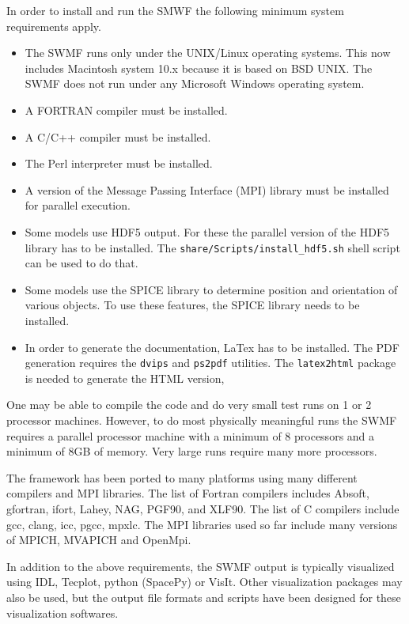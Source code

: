 In order to install and run the SMWF the following minimum system
requirements apply.
\begin{itemize}
\item The SWMF runs only under the UNIX/Linux operating systems.  This now
  includes Macintosh system 10.x because it is based on BSD UNIX.  The
  SWMF does not run under any Microsoft Windows operating system.
\item A FORTRAN compiler must be installed.
\item A C/C++ compiler must be installed.
\item The Perl interpreter must be installed.
\item A version of the Message Passing Interface (MPI) library must be
  installed for parallel execution.
\item Some models use HDF5 output. For these the parallel version of 
  the HDF5 library has to be installed. The {\tt share/Scripts/install\_hdf5.sh}
  shell script can be used to do that.
\item Some models use the SPICE library to determine position and 
  orientation of various objects. To use these features, the SPICE
  library needs to be installed.
\item In order to generate the documentation, LaTex has to be installed.
  The PDF generation requires the {\tt dvips} and {\tt ps2pdf}
  utilities. The  {\tt latex2html} package is needed to generate 
  the HTML version, 
\end{itemize}
One may be able to compile the code and do very small test
runs on 1 or 2 processor machines.  However, to do most physically
meaningful runs the SWMF requires a parallel processor machine with a 
minimum of 8 processors and a minimum of 8GB of memory.
Very large runs require many more processors.

The framework has been ported to many platforms using many different
compilers and MPI libraries. The list of Fortran compilers includes
Absoft, gfortran, ifort, Lahey, NAG, PGF90, and XLF90.
The list of C compilers include gcc, clang, icc, pgcc, mpxlc.
The MPI libraries used so far include many versions of MPICH, MVAPICH and 
OpenMpi. 

In addition to the above requirements, the SWMF output is typically
visualized using IDL, Tecplot, python (SpacePy) or VisIt. 
Other visualization packages may also be used, but the output file
formats and scripts have been designed for these visualization softwares.


